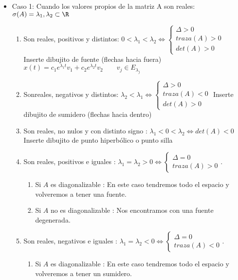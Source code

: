 \begin{itemize}
\item Caso 1: Cuando los valores propios de la matriz A son reales: $\sigma(A)={\lambda_1,\lambda_2}\subset \R$
\begin{enumerate}
\item Son reales, positivos y distintos: $0<\lambda_1<\lambda_2 \Leftrightarrow \left\{ \begin{array}{ll}\Delta > 0 \\ traza(A)>0 \\ det(A) > 0 \end{array}\right.$
Inserte dibujito de fuente (flechas hacia fuera)\\
$x(t)=c_1 e^{\lambda_1t}v_1+c_2 e^{\lambda_2t}v_2 \qquad v_j \in E_{\lambda_j}$
\item Sonreales, negativos y distintos: $\lambda_2 < \lambda_1 \Leftrightarrow \left\{ \begin{array}{ll}\Delta > 0 \\ traza(A) < 0 \\ det(A)>0\end{array}\right.$
Inserte dibujito de sumidero (flechas hacia dentro)
\item Son reales, no nulos y con distinto signo : $\lambda_1 < 0 < \lambda_2 \Leftrightarrow det(A)<0$
Inserte dibujito de punto hiperbólico o punto silla
\item Son reales, positivos e iguales : $\lambda_1=\lambda_2>0 \Leftrightarrow \left\{ \begin{array}{ll} \Delta = 0 \\ traza(A)>0\end{array}\right.$.
\begin{enumerate}
\item Si $A$ es diagonalizable : En este caso tendremos todo el espacio y volveremos a tener una fuente.
\item Si $A$ no es diagonalizable : Nos encontramos con una fuente degenerada.
\end{enumerate}
\item Son reales, negativos e iguales : $\lambda_1=\lambda_2<0 \Leftrightarrow \left\{ \begin{array}{ll} \Delta = 0 \\ traza(A)<0\end{array}\right.$.
\begin{enumerate}
\item Si $A$ es diagonalizable : En este caso tendremos todo el espacio y volveremos a tener un sumidero.

\end{enumerate}
\end{enumerate}
\end{itemize}
